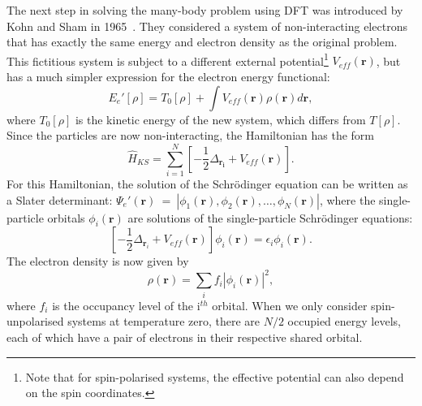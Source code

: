\begin{refsection}
The next step in solving the many-body problem using DFT was introduced by Kohn and Sham in 1965~\cite{Kohn1965}. They considered a system of non-interacting electrons that has exactly the same energy and electron density as the original problem. This fictitious system is subject to a different external potential\footnote{Note that for spin-polarised systems, the effective potential can also depend on the spin coordinates.} $V_{eff}(\mathbf{r})$, but has a much simpler expression for the electron energy functional:
\begin{equation}\label{eq:nonE}
E_{e}'[\rho] = T_0[\rho] + \int V_{eff}(\mathbf{r}) \rho(\mathbf{r}) d\mathbf{r},
\end{equation}
where $T_0[\rho]$ is the kinetic energy of the new system, which differs from $T[\rho]$. Since the particles are now non-interacting, the Hamiltonian has the form
\begin{equation}
\hat{H}_{KS} = \sum_{i=1}^{N} \left[ - \frac{1}{2} \Delta_{\mathbf{r_i}} + V_{eff}(\mathbf{r}) \right].
\end{equation}
For this Hamiltonian, the solution of the Schr\"odinger equation can be written as a Slater determinant: $\Psi_e'(\mathbf{r})~=~\left| \phi_1(\mathbf{r}),\phi_2(\mathbf{r}), \hdots , \phi_N (\mathbf{r})\right|$, where the single-particle orbitals $\phi_i(\mathbf{r})$ are solutions of the single-particle Schr\"odinger equations:
\begin{equation}\label{eq:KS}
\left[- \frac{1}{2} \Delta_{\mathbf{r}_i} + V_{eff}(\mathbf{r}) \right] \phi_i (\mathbf{r}) = \epsilon_i\phi_i (\mathbf{r}).
\end{equation}
The electron density is now given by~\cite{Argaman2002}
\begin{equation}\label{eq:density}
\rho(\mathbf{r}) = \sum_{i} f_i \left|\phi_i(\mathbf{r})\right|^2,
\end{equation}
where $f_i$ is the occupancy level of the i$^{th}$ orbital. When we only consider spin-unpolarised systems at temperature zero, there are $N/2$ occupied energy levels, each of which have a pair of electrons in their respective shared orbital.


\end{refsection}
